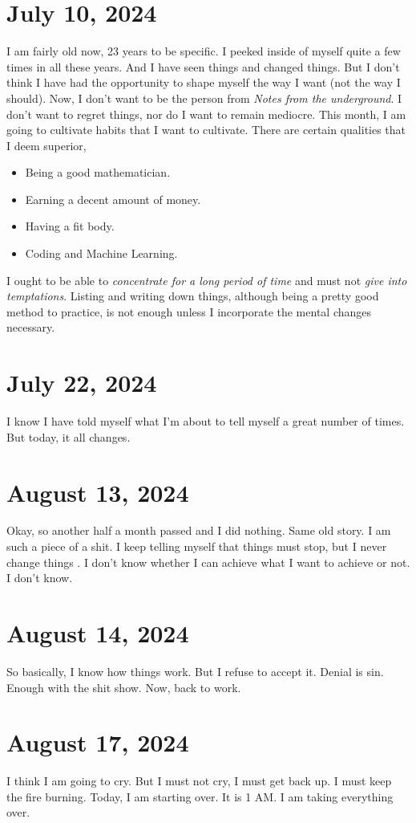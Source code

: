 \section{July 10, 2024}
\noindent I am fairly old now, 23 years to be specific. I peeked inside of myself quite a few times in all
these years. And I have seen things and changed things. But I don't think I have had the opportunity to
shape myself the way I want (not the way I should). Now, I don't want to be the person from \emph{Notes
from the underground}. I don't want to regret things, nor do I want to remain mediocre. This month, I am
going to cultivate habits that I want to cultivate. There are certain qualities that I deem superior,

\begin{itemize}
\itemsep0em
	\item Being a good mathematician.
	\item Earning a decent amount of money.
	\item Having a fit body.
	\item Coding and Machine Learning.
\end{itemize}

\noindent I ought to be able to \emph{concentrate for a long period of time} and must not \emph{give into
temptations}. Listing and writing down things, although being a pretty good method to practice, is not 
enough unless I incorporate the mental changes necessary.

\section{July 22, 2024}
\noindent I know I have told myself what I'm about to tell myself a great number of times. But today, it all
changes.

\section{August 13, 2024}
\noindent Okay, so another half a month passed and I did nothing. Same old story. I am such a piece of a shit.
I keep telling myself that things must stop, but I never change things . I don't know whether I can
achieve what I want to achieve or not. I don't know.

\section{August 14, 2024}
\noindent So basically, I know how things work. But I refuse to accept it. Denial is sin. Enough with the shit
show. Now, back to work.

\section{August 17, 2024}
\noindent I think I am going to cry. But I must not cry, I must get back up. I must keep the fire burning.
Today, I am starting over. It is 1 AM. I am taking everything over.


